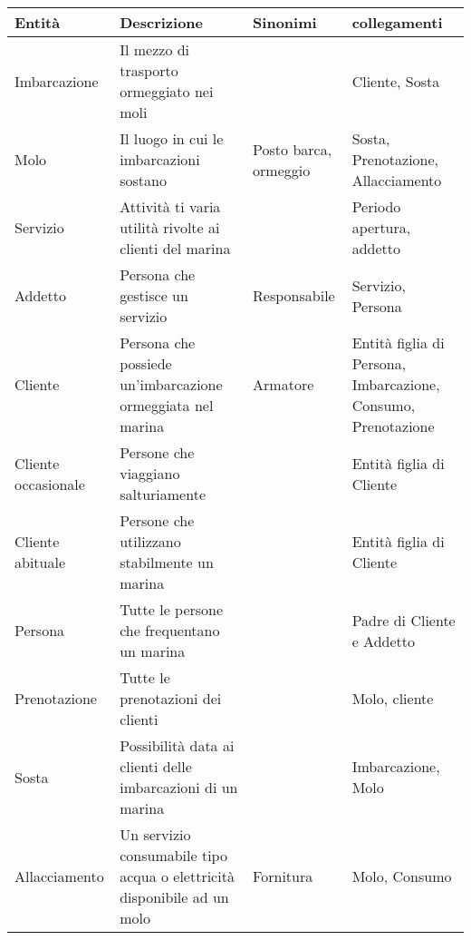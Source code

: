 \begin{center}
    \begin{tabularx}{\textwidth}{|>{\RaggedRight}p{2cm}|p{7cm}|p{2.4cm}|>{\RaggedRight}X|}
        \hline
        \rowcolor{gray!30}
        \textbf{Entità} & \textbf{Descrizione} & \textbf{Sinonimi} & \textbf{collegamenti} \\
        \hline
        Imbarcazione & Il mezzo di trasporto ormeggiato nei moli &  & Cliente, Sosta\\
        
        \hline
        Molo & Il luogo in cui le imbarcazioni sostano & Posto barca, ormeggio & Sosta, Prenotazione, Allacciamento\\
        
        \hline
        Servizio & Attività ti varia utilità rivolte ai clienti del marina &  & Periodo apertura, addetto \\
        
        \hline
        Addetto & Persona che gestisce un servizio & Responsabile & Servizio, Persona \\

        \hline
        Cliente& Persona che possiede un'imbarcazione ormeggiata nel  marina & Armatore & Entità figlia di Persona, Imbarcazione, Consumo, Prenotazione\\
        
        \hline
        Cliente occasionale &Persone che viaggiano salturiamente & & Entità figlia di Cliente  \\
         
        \hline
        Cliente abituale & Persone che utilizzano stabilmente un marina &  & Entità figlia di Cliente \\
          
        \hline
        Persona& Tutte le persone che frequentano un marina   &  & Padre di Cliente e Addetto \\  
        
        \hline
        Prenotazione & Tutte le prenotazioni dei clienti &  & Molo, cliente \\
        
        \hline
        Sosta & Possibilità data ai clienti delle imbarcazioni di un marina  & & Imbarcazione, Molo \\
        
        \hline
        Allacciamento & Un servizio consumabile tipo acqua o elettricità disponibile ad un molo & Fornitura & Molo, Consumo\\
        

\end{tabularx}
\end{center}
